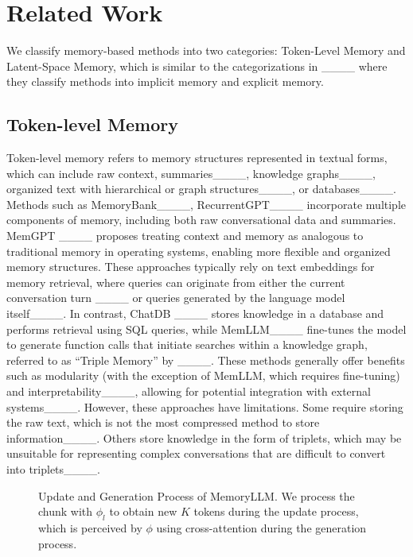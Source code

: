 \section{Related Work}
\vspace{-5pt}
We classify memory-based methods into two categories: Token-Level Memory and Latent-Space Memory, which is similar to the categorizations in ____ where they classify methods into implicit memory and explicit memory. 

\vspace{-5pt}
\subsection{Token-level Memory}
Token-level memory refers to memory structures represented in textual forms, which can include raw context, summaries____, knowledge graphs____, organized text with hierarchical or graph structures____, or databases____. 
Methods such as MemoryBank____, RecurrentGPT____ incorporate multiple components of memory, including both raw conversational data and summaries. MemGPT ____ proposes treating context and memory as analogous to traditional memory in operating systems, enabling more flexible and organized memory structures. These approaches typically rely on text embeddings for memory retrieval, where queries can originate from either the current conversation turn ____ or queries generated by the language model itself____. In contrast, ChatDB ____ stores knowledge in a database and performs retrieval using SQL queries, while MemLLM____ fine-tunes the model to generate function calls that initiate searches within a knowledge graph, referred to as ``Triple Memory'' by ____. These methods generally offer benefits such as modularity (with the exception of MemLLM, which requires fine-tuning) and interpretability____, allowing for potential integration with external systems____. However, these approaches have limitations. Some require storing the raw text, which is not the most compressed method to store information____. Others store knowledge in the form of triplets, which may be unsuitable for representing complex conversations that are difficult to convert into triplets____. 

\begin{figure*}[t]
\centering
{}
\hfill
{}
\vspace{-10pt}
\caption{Update and Generation Process of MemoryLLM. We process the chunk with $\phi_l$ to obtain new $K$ tokens during the update process, which is perceived by $\phi$ using cross-attention during the generation process.}
\label{fig:memoryllm_update_generate}
\vspace{-10pt}
\end{figure*}

